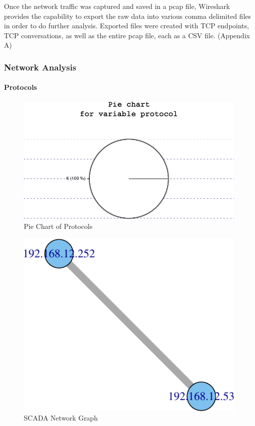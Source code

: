 \documentclass[12pt,]{article}
\begin{document}
Once the network traffic was captured and saved in a pcap file,
Wireshark provides the capability to export the raw data into various
comma delimited files in order to do further analysis. Exported files
were created with TCP endpoints, TCP conversations, as well as the
entire pcap file, each as a CSV file. (Appendix A)

\newpage

\subsubsection{Network Analysis}\label{network-analysis}

\paragraph{Protocols}\label{protocols-1}

\begin{figure}

{\centering \includegraphics{thesis_files/figure-latex/unnamed-chunk-14-1} 

}

\caption{Pie Chart of Protocols}\label{fig:unnamed-chunk-14}
\end{figure}

\begin{figure}

{\centering \includegraphics{thesis_files/figure-latex/warning-1} 

}

\caption{SCADA Network Graph}\label{fig:warning}
\end{figure}
\end{document}
